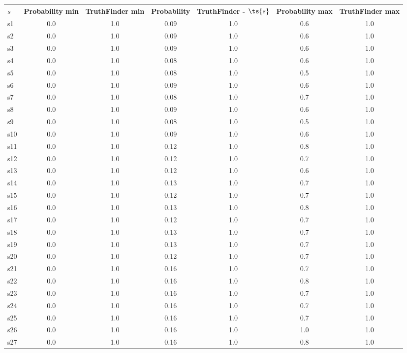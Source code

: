 \documentclass{article}
\begin{document}
\noindent\begin{tabular}{|l|c|c|c|c|c|c|}
\hline
$s$& Probability min & TruthFinder min & Probability & TruthFinder - $\ts{s}$ & Probability max & TruthFinder max\\
\hline
s1 &0.0 & 1.0 & 0.09 & 1.0 & 0.6 & 1.0\\
\hline
s2 &0.0 & 1.0 & 0.09 & 1.0 & 0.6 & 1.0\\
\hline
s3 &0.0 & 1.0 & 0.09 & 1.0 & 0.6 & 1.0\\
\hline
s4 &0.0 & 1.0 & 0.08 & 1.0 & 0.6 & 1.0\\
\hline
s5 &0.0 & 1.0 & 0.08 & 1.0 & 0.5 & 1.0\\
\hline
s6 &0.0 & 1.0 & 0.09 & 1.0 & 0.6 & 1.0\\
\hline
s7 &0.0 & 1.0 & 0.08 & 1.0 & 0.7 & 1.0\\
\hline
s8 &0.0 & 1.0 & 0.09 & 1.0 & 0.6 & 1.0\\
\hline
s9 &0.0 & 1.0 & 0.08 & 1.0 & 0.5 & 1.0\\
\hline
s10 &0.0 & 1.0 & 0.09 & 1.0 & 0.6 & 1.0\\
\hline
s11 &0.0 & 1.0 & 0.12 & 1.0 & 0.8 & 1.0\\
\hline
s12 &0.0 & 1.0 & 0.12 & 1.0 & 0.7 & 1.0\\
\hline
s13 &0.0 & 1.0 & 0.12 & 1.0 & 0.6 & 1.0\\
\hline
s14 &0.0 & 1.0 & 0.13 & 1.0 & 0.7 & 1.0\\
\hline
s15 &0.0 & 1.0 & 0.12 & 1.0 & 0.7 & 1.0\\
\hline
s16 &0.0 & 1.0 & 0.13 & 1.0 & 0.8 & 1.0\\
\hline
s17 &0.0 & 1.0 & 0.12 & 1.0 & 0.7 & 1.0\\
\hline
s18 &0.0 & 1.0 & 0.13 & 1.0 & 0.7 & 1.0\\
\hline
s19 &0.0 & 1.0 & 0.13 & 1.0 & 0.7 & 1.0\\
\hline
s20 &0.0 & 1.0 & 0.12 & 1.0 & 0.7 & 1.0\\
\hline
s21 &0.0 & 1.0 & 0.16 & 1.0 & 0.7 & 1.0\\
\hline
s22 &0.0 & 1.0 & 0.16 & 1.0 & 0.8 & 1.0\\
\hline
s23 &0.0 & 1.0 & 0.16 & 1.0 & 0.7 & 1.0\\
\hline
s24 &0.0 & 1.0 & 0.16 & 1.0 & 0.7 & 1.0\\
\hline
s25 &0.0 & 1.0 & 0.16 & 1.0 & 0.7 & 1.0\\
\hline
s26 &0.0 & 1.0 & 0.16 & 1.0 & 1.0 & 1.0\\
\hline
s27 &0.0 & 1.0 & 0.16 & 1.0 & 0.8 & 1.0\\

\end{tabular}
\end{document}
